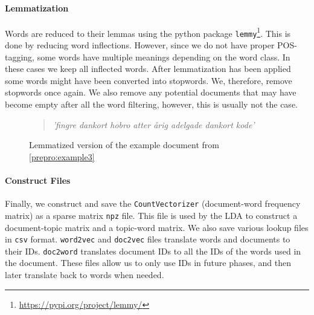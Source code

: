 \paragraph{Lemmatization}
Words are reduced to their lemmas using the python package \texttt{lemmy}\footnote{\url{https://pypi.org/project/lemmy/}}. 
This is done by reducing word inflections.
However, since we do not have proper POS-tagging, some words have multiple meanings depending on the word class.
In these cases we keep all inflected words.
After lemmatization has been applied some words might have been converted into stopwords.
We, therefore, remove stopwords once again.
We also remove any potential documents that may have become empty after all the word filtering, however, this is usually not the case.
\begin{figure}[h]
	\begin{framed}
		\begin{quote}
			\textit{
				'fingre dankort hobro atter årig adelgade dankort kode'
			}
		\end{quote}
	\end{framed}
	\caption{Lemmatized version of the example document from \autoref{prepro:example3}}
	\label{prepro:example5}
\end{figure}

\paragraph{Construct Files}
Finally, we construct and save the \texttt{CountVectorizer} (document-word frequency matrix) as a sparse matrix \texttt{npz} file.
This file is used by the LDA to construct a document-topic matrix and a topic-word matrix.
We also save various lookup files in \texttt{csv} format.
\texttt{word2vec} and \texttt{doc2vec} files translate words and documents to their IDs.
\texttt{doc2word} translates document IDs to all the IDs of the words used in the document.
These files allow us to only use IDs in future phases, and then later translate back to words when needed.

